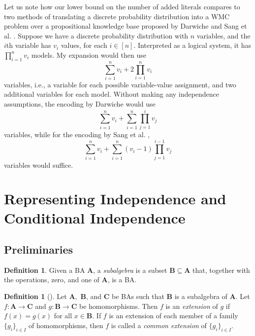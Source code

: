 \documentclass{article}
\theoremstyle{definition}
\newtheorem{definition}[theorem]{Definition}
\theoremstyle{remark}
\begin{document}

Let us note how our lower bound on the number of added literals compares to two
methods of translating a discrete probability distribution into a WMC problem
over a propositional knowledge base proposed by Darwiche
\cite{DBLP:conf/kr/Darwiche02} and Sang et al. \cite{DBLP:conf/aaai/SangBK05}.
Suppose we have a discrete probability distribution with  $n$ variables, and the
$i$th variable has $v_i$ values, for each $i \in [n]$. Interpreted as a logical
system, it has $\prod_{i=1}^n v_i$ models. My expansion would then use
\[
  \sum_{i=1}^n v_i + 2\prod_{i=1}^n v_i
\]
variables, i.e., a variable for each possible variable-value assignment, and two
additional variables for each model. Without making any independence
assumptions, the encoding by Darwiche \cite{DBLP:conf/kr/Darwiche02} would use
\[
  \sum_{i=1}^n v_i + \sum_{i=1}^n \prod_{j=1}^i v_j
\]
variables, while for the encoding by Sang et al. \cite{DBLP:conf/aaai/SangBK05},
\[
  \sum_{i=1}^n v_i + \sum_{i=1}^n (v_i - 1) \prod_{j=1}^{i-1} v_j
\]
variables would suffice.


\section{Representing Independence and Conditional Independence}

\subsection{Preliminaries}

\begin{definition}
  Given a BA $\mathbf{A}$, a \emph{subalgebra} is a subset $\mathbf{B} \subseteq
  \mathbf{A}$ that, together with the operations, zero, and one of $\mathbf{A}$,
  is a BA.
\end{definition}

\begin{definition}[\cite{givant2008introduction}]
  Let $\mathbf{A},$ $\mathbf{B}$, and $\mathbf{C}$ be BAs such that $\mathbf{B}$
  is a subalgebra of $\mathbf{A}$. Let $f\colon \mathbf{A} \to \mathbf{C}$ and
  $g\colon \mathbf{B} \to \mathbf{C}$ be homomorphisms. Then $f$ is an
  \emph{extension} of $g$ if $f(x) = g(x)$ for all $x \in \mathbf{B}$. If $f$ is
  an extension of each member of a family $\{ g_i \}_{i \in I}$ of
  homomorphisms, then $f$ is called a \emph{common extension} of $\{ g_i \}_{i
    \in I}$.
\end{definition}
\end{document}
